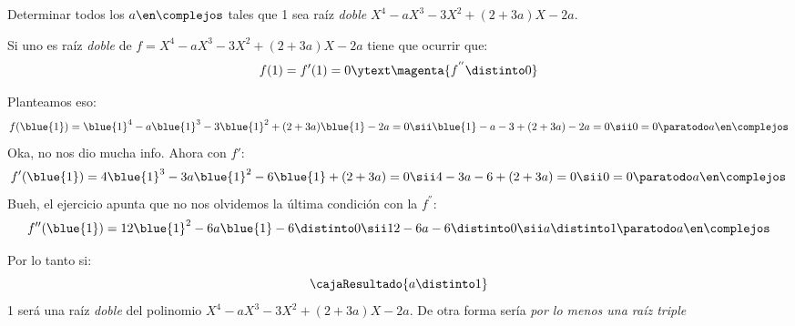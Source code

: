 \begin{enunciado}{\ejercicio}
	Determinar todos los $a \en \complejos$ tales que 1 sea raíz \textit{doble}
	$X^4 - aX^3 - 3X^2 + (2 + 3a)X -2a$.
\end{enunciado}

Si uno es raíz \textit{doble} de $f = X^4 - aX^3 - 3X^2 + (2 + 3a)X -2a$ tiene que ocurrir que:
$$
	f(1) = f'(1) = 0 \ytext \magenta{f^{''} \distinto 0}
$$

Planteamos eso:
$$
	f(\blue{1}) = \blue{1}^4 - a\blue{1}^3 - 3\blue{1}^2 + (2 + 3a) \blue{1} -2a = 0
	\sii
	\blue{1} - a - 3 + (2 + 3a) - 2a = 0
	\sii
	0 = 0 \paratodo a \en \complejos
$$
Oka, no nos dio mucha info. Ahora con $f'$:
$$
	f'(\blue{1}) = 4\blue{1}^3 - 3a\blue{1}^2 - 6\blue{1} + (2 + 3a) = 0
	\sii
	4 - 3a - 6 + (2 + 3a) = 0
	\sii
	0 = 0 \paratodo a \en \complejos
$$
Bueh, el ejercicio apunta que no nos olvidemos la última condición con la $f^{''}$:
$$
	f''(\blue{1}) = 12\blue{1}^2 - 6a\blue{1} - 6 \distinto 0
	\sii
	12 - 6a - 6 \distinto 0
	\sii
	a \distinto 1 \paratodo a \en \complejos
$$

Por lo tanto si:
$$
	\cajaResultado{
		a \distinto 1
	}
$$
1 será una raíz \textit{doble} del polinomio $X^4 - aX^3 - 3X^2 + (2 + 3a)X -2a$.
De otra forma sería \textit{por lo menos una raíz triple}

\begin{aportes}
\item {}
\end{aportes}
